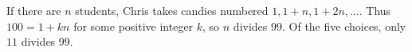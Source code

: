 If there are $n$ students, Chris takes candies numbered $1,1+n,1+2n,\ldots$. Thus $100=1+kn$ for some positive integer $k$, so $n$ divides $99$. Of the five choices, only $\boxed{11}$ divides $99$.
